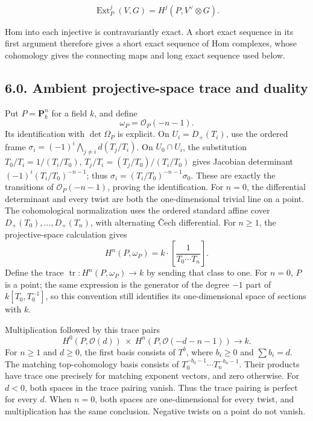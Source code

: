 \documentclass[11pt,a4paper,openany]{report}
\begin{document}
\[
\operatorname{Ext}^j_P(V,G)=H^j(P,V^\vee\otimes G).
\]

Hom into each injective is contravariantly exact. A short exact sequence in its first argument therefore gives a short exact sequence of Hom complexes, whose cohomology gives the connecting maps and long exact sequence used below.

\subsection{6.0. Ambient projective-space trace and duality}\label{AG-RG-S02-ambient-projective-space-trace-and-duality}

Put \(P=\mathbf P^n_k\) for a field \(k\), and define \[
\omega_P=\mathcal O_P(-n-1).
\] Its identification with \(\det\Omega_P\) is explicit. On \(U_i=D_+(T_i)\), use the ordered frame \(\sigma_i=(-1)^i\bigwedge_{j\ne i}d(T_j/T_i)\). On \(U_0\cap U_i\), the substitution \(T_0/T_i=1/(T_i/T_0)\), \(T_j/T_i=(T_j/T_0)/(T_i/T_0)\) gives Jacobian determinant \((-1)^i(T_i/T_0)^{-n-1}\); thus \(\sigma_i=(T_i/T_0)^{-n-1}\sigma_0\). These are exactly the transitions of \(\mathcal O_P(-n-1)\), proving the identification. For \(n=0\), the differential determinant and every twist are both the one-dimensional trivial line on a point. The cohomological normalization uses the ordered standard affine cover \(D_+(T_0),\ldots,D_+(T_n)\), with alternating Čech differential. For \(n\geq1\), the projective-space calculation gives \[
H^n(P,\omega_P)=k\cdot\left[\frac1{T_0\cdots T_n}\right].
\] Define the trace \(\operatorname{tr}:H^n(P,\omega_P)\to k\) by sending that class to one. For \(n=0\), \(P\) is a point; the same expression is the generator of the degree \(-1\) part of \(k[T_0,T_0^{-1}]\), so this convention still identifies its one-dimensional space of sections with \(k\).

Multiplication followed by this trace pairs \[
H^0(P,\mathcal O(d))\ \times\
H^n(P,\mathcal O(-d-n-1))\longrightarrow k.
\] For \(n\geq1\) and \(d\geq0\), the first basis consists of \(T^b\), where \(b_i\geq0\) and \(\sum b_i=d\). The matching top-cohomology basis consists of \(T_0^{-b_0-1}\cdots T_n^{-b_n-1}\). Their products have trace one precisely for matching exponent vectors, and zero otherwise. For \(d<0\), both spaces in the trace pairing vanish. Thus the trace pairing is perfect for every \(d\). When \(n=0\), both spaces are one-dimensional for every twist, and multiplication has the same conclusion. Negative twists on a point do not vanish.
\end{document}
